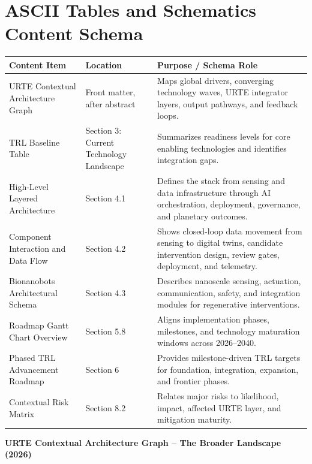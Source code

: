\documentclass[11pt,a4paper]{article}
\begin{document}
\section*{ASCII Tables and Schematics Content Schema}
\begin{table}[H]
\centering
\small
\renewcommand{\arraystretch}{1.15}
\begin{tabular}{p{3.0cm} p{4.2cm} p{6.5cm}}
\toprule
\textbf{Content Item} & \textbf{Location} & \textbf{Purpose / Schema Role} \\
\midrule
URTE Contextual Architecture Graph & Front matter, after abstract & Maps global drivers, converging technology waves, URTE integrator layers, output pathways, and feedback loops. \\
TRL Baseline Table & Section 3: Current Technology Landscape & Summarizes readiness levels for core enabling technologies and identifies integration gaps. \\
High-Level Layered Architecture & Section 4.1 & Defines the stack from sensing and data infrastructure through AI orchestration, deployment, governance, and planetary outcomes. \\
Component Interaction and Data Flow & Section 4.2 & Shows closed-loop data movement from sensing to digital twins, candidate intervention design, review gates, deployment, and telemetry. \\
Bionanobots Architectural Schema & Section 4.3 & Describes nanoscale sensing, actuation, communication, safety, and integration modules for regenerative interventions. \\
Roadmap Gantt Chart Overview & Section 5.8 & Aligns implementation phases, milestones, and technology maturation windows across 2026--2040. \\
Phased TRL Advancement Roadmap & Section 6 & Provides milestone-driven TRL targets for foundation, integration, expansion, and frontier phases. \\
Contextual Risk Matrix & Section 8.2 & Relates major risks to likelihood, impact, affected URTE layer, and mitigation maturity. \\
\bottomrule
\end{tabular}
\end{table}

\newpage


\begin{center}
\textbf{\large URTE Contextual Architecture Graph -- The Broader Landscape (2026)}
\end{center}
\end{document}
